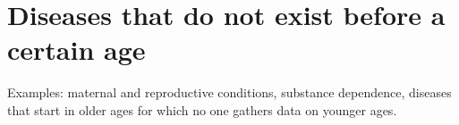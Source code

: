 \section{Diseases that do not exist before a certain age}

Examples: maternal and reproductive conditions, substance dependence,
diseases that start in older ages for which no one gathers data on
younger ages.

